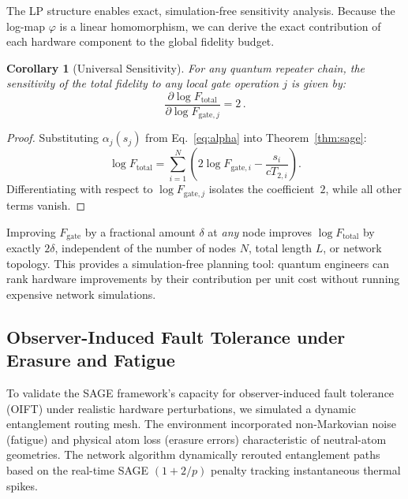 \documentclass[aps,pra,reprint,amsmath,amssymb,superscriptaddress]{revtex4-2}
\newtheorem{corollary}[theorem]{Corollary}
\begin{document}
The LP structure enables exact, simulation-free sensitivity analysis. Because the log-map $\varphi$ is a linear homomorphism, we can derive the exact contribution of each hardware component to the global fidelity budget.
\begin{corollary}[Universal Sensitivity]
For any quantum repeater chain, the sensitivity of the total fidelity to any local gate operation $j$ is given by:
\begin{equation}
\frac{\partial \log F_{\text{total}}}{\partial \log F_{\text{gate},j}} = 2 \,.
\label{eq:sensitivity}
\end{equation}
\end{corollary}
\begin{proof}
Substituting $\alpha_j(s_j)$ from Eq.~\eqref{eq:alpha} into Theorem~\ref{thm:sage}:
\begin{equation}
\log F_{\text{total}} = \sum_{i=1}^N \left( 2\log F_{\text{gate},i} - \frac{s_i}{c T_{2,i}} \right) .
\end{equation}
Differentiating with respect to $\log F_{\text{gate},j}$ isolates the coefficient~$2$, while all other terms vanish.
\end{proof}
Improving $F_{\text{gate}}$ by a fractional amount $\delta$ at \emph{any} node improves $\log F_{\text{total}}$ by exactly $2\delta$, independent of the number of nodes $N$, total length $L$, or network topology. This provides a simulation-free planning tool: quantum engineers can rank hardware improvements by their contribution per unit cost without running expensive network simulations.

\subsection{Observer-Induced Fault Tolerance under Erasure and Fatigue}
\label{sec:feedback_simulation}

To validate the SAGE framework's capacity for observer-induced fault tolerance (OIFT) under realistic hardware perturbations, we simulated a dynamic entanglement routing mesh. The environment incorporated non-Markovian noise (fatigue) and physical atom loss (erasure errors) characteristic of neutral-atom geometries. The network algorithm dynamically rerouted entanglement paths based on the real-time SAGE $(1+2/p)$ penalty tracking instantaneous thermal spikes.
\end{document}

